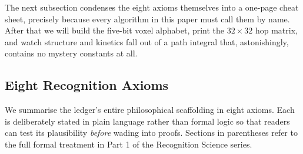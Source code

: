 \documentclass[11pt]{article}
\begin{document}
The next subsection condenses the eight axioms themselves into a
one-page cheat sheet, precisely because every algorithm in this paper
must call them by name.  After that we will build the five-bit voxel
alphabet, print the \(32\times32\) hop matrix, and watch structure and
kinetics fall out of a path integral that, astonishingly, contains no
mystery constants at all.


\subsection{Eight Recognition Axioms}\label{sec:axioms}

We summarise the ledger’s entire philosophical scaffolding in eight
axioms.  Each is deliberately stated in plain language rather than
formal logic so that readers can test its plausibility \emph{before}
wading into proofs.  Sections in parentheses refer to the full formal
treatment in Part 1 of the Recognition Science series.
\end{document}
